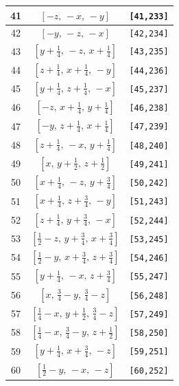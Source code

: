 \documentclass[fleqn,8pt]{jsarticle}
\begin{document}
\begin{longtable}{ccc}
41 & $\left[ - z,\, - x,\, - y \right]$ & {\tt [41,233]} \\ \hline
42 & $\left[ - y,\, - z,\, - x \right]$ & {\tt [42,234]} \\ \hline
43 & $\left[ y + \frac{1}{4},\, - z,\, x + \frac{1}{4} \right]$ & {\tt [43,235]} \\ \hline
44 & $\left[ z + \frac{1}{4},\, x + \frac{1}{4},\, - y \right]$ & {\tt [44,236]} \\ \hline
45 & $\left[ y + \frac{1}{4},\, z + \frac{1}{4},\, - x \right]$ & {\tt [45,237]} \\ \hline
46 & $\left[ - z,\, x + \frac{1}{4},\, y + \frac{1}{4} \right]$ & {\tt [46,238]} \\ \hline
47 & $\left[ - y,\, z + \frac{1}{4},\, x + \frac{1}{4} \right]$ & {\tt [47,239]} \\ \hline
48 & $\left[ z + \frac{1}{4},\, - x,\, y + \frac{1}{4} \right]$ & {\tt [48,240]} \\ \hline
49 & $\left[ x,\, y + \frac{1}{2},\, z + \frac{1}{2} \right]$ & {\tt [49,241]} \\ \hline
50 & $\left[ x + \frac{1}{4},\, - z,\, y + \frac{3}{4} \right]$ & {\tt [50,242]} \\ \hline
51 & $\left[ x + \frac{1}{4},\, z + \frac{3}{4},\, - y \right]$ & {\tt [51,243]} \\ \hline
52 & $\left[ z + \frac{1}{4},\, y + \frac{3}{4},\, - x \right]$ & {\tt [52,244]} \\ \hline
53 & $\left[ \frac{1}{2} - z,\, y + \frac{3}{4},\, x + \frac{3}{4} \right]$ & {\tt [53,245]} \\ \hline
54 & $\left[ \frac{1}{2} - y,\, x + \frac{3}{4},\, z + \frac{3}{4} \right]$ & {\tt [54,246]} \\ \hline
55 & $\left[ y + \frac{1}{4},\, - x,\, z + \frac{3}{4} \right]$ & {\tt [55,247]} \\ \hline
56 & $\left[ x,\, \frac{3}{4} - y,\, \frac{3}{4} - z \right]$ & {\tt [56,248]} \\ \hline
57 & $\left[ \frac{1}{4} - x,\, y + \frac{1}{2},\, \frac{3}{4} - z \right]$ & {\tt [57,249]} \\ \hline
58 & $\left[ \frac{1}{4} - x,\, \frac{3}{4} - y,\, z + \frac{1}{2} \right]$ & {\tt [58,250]} \\ \hline
59 & $\left[ y + \frac{1}{4},\, x + \frac{3}{4},\, - z \right]$ & {\tt [59,251]} \\ \hline
60 & $\left[ \frac{1}{2} - y,\, - x,\, - z \right]$ & {\tt [60,252]} \\ \hline

\end{longtable}
\end{document}
